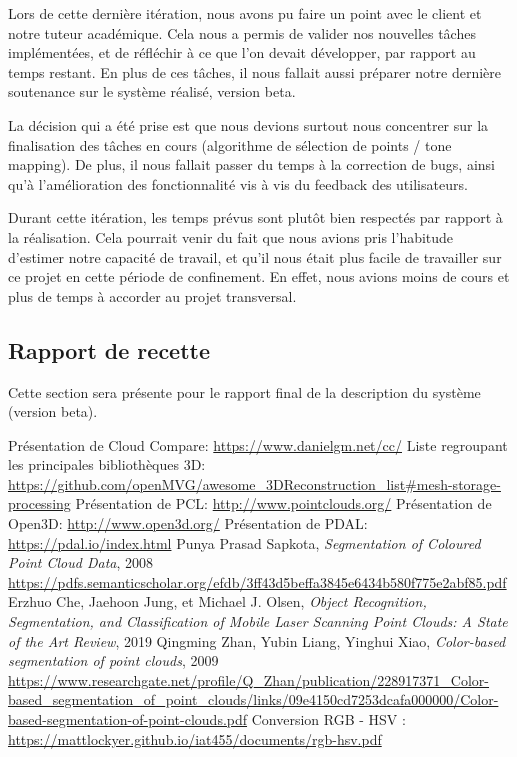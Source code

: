 \documentclass[12pt,titlepage,french]{article}
\begin{document}
Lors de cette dernière itération, nous avons pu faire un point avec le client et notre tuteur académique. Cela nous a permis de valider nos nouvelles tâches implémentées, et de réfléchir à ce que l'on devait développer, par rapport au temps restant. En plus de ces tâches, il nous fallait aussi préparer notre dernière soutenance sur le système réalisé, version beta. \newline

La décision qui a été prise est que nous devions surtout nous concentrer sur la finalisation des tâches en cours (algorithme de sélection de points / tone mapping). De plus, il nous fallait passer du temps à la correction de bugs, ainsi qu'à l'amélioration des fonctionnalité vis à vis du feedback des utilisateurs. \newline

Durant cette itération, les temps prévus sont plutôt bien respectés par rapport à la réalisation. Cela pourrait venir du fait que nous avions pris l'habitude d'estimer notre capacité de travail, et qu'il nous était plus facile de travailler sur ce projet en cette période de confinement. En effet, nous avions moins de cours et plus de temps à accorder au projet transversal.

\subsection{Rapport de recette}

Cette section sera présente pour le rapport final de la description du système (version beta).
\begin{thebibliography}{3}
	 Présentation de Cloud Compare: \url{https://www.danielgm.net/cc/}
	 Liste regroupant les principales bibliothèques 3D: \url{https://github.com/openMVG/awesome_3DReconstruction_list#mesh-storage-processing}
	 Présentation de PCL: \url{http://www.pointclouds.org/}
	 Présentation de Open3D: \url{http://www.open3d.org/}
	 Présentation de PDAL: \url{https://pdal.io/index.html}
	 Punya Prasad Sapkota, \textit{Segmentation of Coloured Point Cloud Data}, 2008 \url{https://pdfs.semanticscholar.org/efdb/3ff43d5beffa3845e6434b580f775e2abf85.pdf}
	 Erzhuo Che, Jaehoon Jung, et Michael J. Olsen, \textit{Object Recognition, Segmentation, and Classification of Mobile Laser Scanning Point Clouds: A State of the Art Review}, 2019
	 Qingming Zhan, Yubin Liang, Yinghui Xiao, \textit{Color-based segmentation of point clouds}, 2009 \url{https://www.researchgate.net/profile/Q_Zhan/publication/228917371_Color-based_segmentation_of_point_clouds/links/09e4150cd7253dcafa000000/Color-based-segmentation-of-point-clouds.pdf}
  	 Conversion RGB - HSV : \url{https://mattlockyer.github.io/iat455/documents/rgb-hsv.pdf}
\end{thebibliography}
\end{document}
